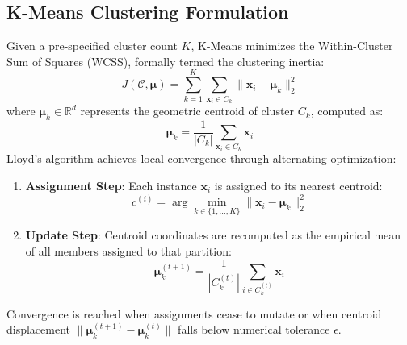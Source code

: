\documentclass[12pt]{article}
\begin{document}
\subsection{K-Means Clustering Formulation}
Given a pre-specified cluster count $K$, K-Means minimizes the Within-Cluster Sum of Squares (WCSS), formally termed the clustering inertia:
\begin{equation}
J(\mathcal{C}, \boldsymbol{\mu}) = \sum_{k=1}^K \sum_{\mathbf{x}_i \in C_k} \|\mathbf{x}_i - \boldsymbol{\mu}_k\|_2^2
\end{equation}
where $\boldsymbol{\mu}_k \in \mathbb{R}^d$ represents the geometric centroid of cluster $C_k$, computed as:
\begin{equation}
\boldsymbol{\mu}_k = \frac{1}{|C_k|} \sum_{\mathbf{x}_i \in C_k} \mathbf{x}_i
\end{equation}
Lloyd's algorithm achieves local convergence through alternating optimization:
\begin{enumerate}
    \item \textbf{Assignment Step}: Each instance $\mathbf{x}_i$ is assigned to its nearest centroid:
    \begin{equation}
    c^{(i)} = \arg\min_{k \in \{1, \dots, K\}} \|\mathbf{x}_i - \boldsymbol{\mu}_k\|_2^2
    \end{equation}
    \item \textbf{Update Step}: Centroid coordinates are recomputed as the empirical mean of all members assigned to that partition:
    \begin{equation}
    \boldsymbol{\mu}_k^{(t+1)} = \frac{1}{|C_k^{(t)}|} \sum_{i \in C_k^{(t)}} \mathbf{x}_i
    \end{equation}
\end{enumerate}
Convergence is reached when assignments cease to mutate or when centroid displacement $\|\boldsymbol{\mu}_k^{(t+1)} - \boldsymbol{\mu}_k^{(t)}\|$ falls below numerical tolerance $\epsilon$.
\end{document}
